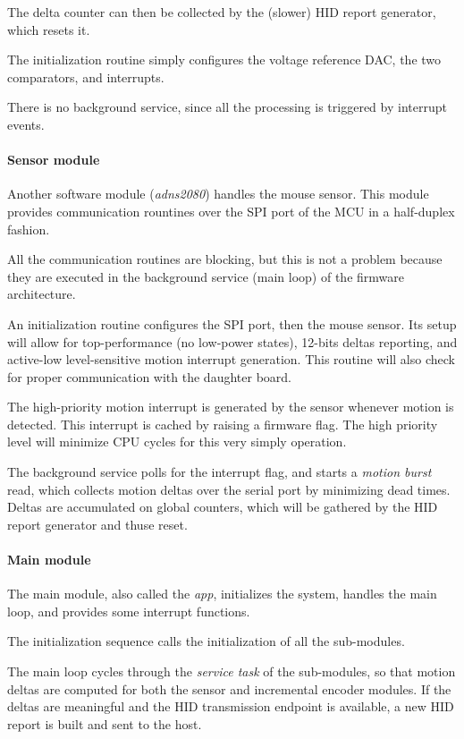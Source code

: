 \documentclass[a4paper,10pt]{article}
\begin{document}
\begin{multicols}{2}
The delta counter can then be collected by the (slower) HID report generator,
which resets it.

The initialization routine simply configures the voltage reference DAC, the
two comparators, and interrupts.

There is no background service, since all the processing is triggered by
interrupt events.


\paragraph{Sensor module}
Another software module (\emph{adns2080}) handles the mouse sensor. This
module provides communication rountines over the SPI port of the MCU in a
half-duplex fashion.

All the communication routines are blocking, but this is not a problem because
they are executed in the background service (main loop) of the firmware
architecture.

An initialization routine configures the SPI port, then the mouse sensor. Its
setup will allow for top-performance (no low-power states), 12-bits deltas
reporting, and active-low level-sensitive motion interrupt generation.
This routine will also check for proper communication with the daughter board.

The high-priority motion interrupt is generated by the sensor whenever motion
is detected. This interrupt is cached by raising a firmware flag. The high
priority level will minimize CPU cycles for this very simply operation.

The background service polls for the interrupt flag, and starts a \emph{motion
burst} read, which collects motion deltas over the serial port by minimizing
dead times. Deltas are accumulated on global counters, which will be gathered
by the HID report generator and thuse reset.


\paragraph{Main module}
The main module, also called the \emph{app}, initializes the system, handles
the main loop, and provides some interrupt functions.

The initialization sequence calls the initialization of all the sub-modules.

The main loop cycles through the \emph{service task} of the sub-modules, so
that motion deltas are computed for both the sensor and incremental encoder
modules. If the deltas are meaningful and the HID transmission endpoint is
available, a new HID report is built and sent to the host.


\end{multicols}
\end{document}
